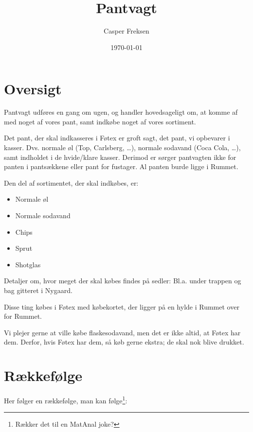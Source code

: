 

\title{Pantvagt}
\date{\today}
\author{Casper Freksen}



\maketitle

\section{Oversigt}
\label{sec:oversigt}

Pantvagt udføres en gang om ugen, og handler hovedsageligt om, at
komme af med noget af vores pant, samt indkøbe noget af vores
sortiment.

Det pant, der skal indkasseres i Føtex er groft sagt, det pant, vi
opbevarer i kasser. Dvs. normale øl (Top, Carlsberg, \dots), normale
sodavand (Coca Cola, \dots), samt indholdet i de hvide/klare
kasser. Derimod er sørger pantvagten ikke for panten i pantsækkene
eller pant for fustager. Al panten burde ligge i Rummet.

Den del af sortimentet, der skal indkøbes, er:
\begin{itemize}
\item Normale øl
\item Normale sodavand
\item Chips
\item Sprut
\item Shotglas
\end{itemize}
Detaljer om, hvor meget der skal købes findes på sedler: Bl.a. under
trappen og bag gitteret i Nygaard.

Disse ting købes i Føtex med købekortet, der ligger på en hylde i
Rummet over for Rummet.

Vi plejer gerne at ville købe flaskesodavand, men det er ikke altid,
at Føtex har dem. Derfor, hvis Føtex har dem, så køb gerne ekstra; de
skal nok blive drukket.

\section{Rækkefølge}
\label{sec:rakkefolge}

Her følger en rækkefølge, man kan følge\footnote{Rækker det til en MatAnal joke?}:

